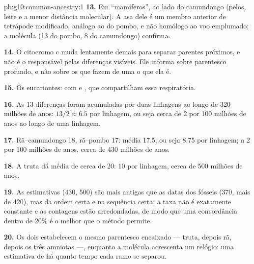 \begin{solution}{pb:g10:common-ancestry:1}
\textbf{13.} Em ``mamíferos'', ao lado do camundongo (pelos, leite e a
menor distância molecular). A asa dele é um membro anterior de
tetrápode modificado, análogo ao do pombo, e não homólogo ao voo
emplumado; a molécula (13 do pombo, 8 do camundongo) confirma.

\textbf{14.} O citocromo c muda lentamente demais para separar parentes
próximos, e não é o  responsável pelas diferenças visíveis. Ele
informa sobre parentesco profundo, e não sobre os  que fazem de
uma  o que ela é.

\textbf{15.} Os eucariontes:  com  e , que
compartilham essa  respiratória.

\textbf{16.} As 13 diferenças foram acumuladas por duas linhagens ao
longo de 320 milhões de anos: $13/2 \approx 6.5$ por linhagem, ou seja
cerca de 2 por 100 milhões de anos ao longo de uma linhagem.

\textbf{17.} Rã--camundongo 18, rã--pombo 17: média 17.5, ou seja 8.75
por linhagem; a 2 por 100 milhões de anos, cerca de 430 milhões de anos.

\textbf{18.} A truta dá média de cerca de 20: 10 por linhagem, cerca de
500 milhões de anos.

\textbf{19.} As estimativas (430, 500) são mais antigas que as datas
dos fósseis (370, mais de 420), mas da ordem certa e na sequência
certa; a taxa não é exatamente constante e as contagens estão
arredondadas, de modo que uma concordância dentro de 20\% é o melhor
que o método permite.

\textbf{20.} Os dois estabelecem o mesmo parentesco encaixado ---
truta, depois rã, depois os três amniotas ---, enquanto a molécula
acrescenta um relógio: uma estimativa de há quanto tempo cada ramo se
separou.
\end{solution}

